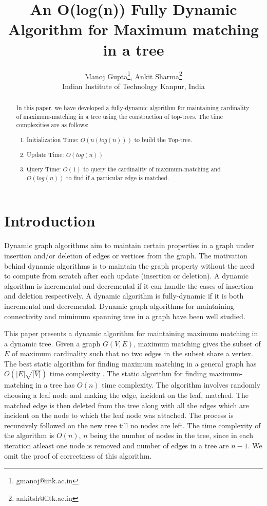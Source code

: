 \documentclass[a4paper,12pt]{article}
\title{An O(log(n)) Fully Dynamic Algorithm for Maximum matching in a tree}
\author{Manoj Gupta\footnote{gmanoj@iitk.ac.in}, Ankit Sharma\footnote{ankitsh@iitk.ac.in}\\Indian Institute of Technology Kanpur, India}
\begin{document}
\maketitle
\begin{abstract}
In this paper, we have developed a fully-dynamic algorithm for maintaining cardinality of maximum-matching in a tree using the construction of top-trees. The time complexities are as follows:
\begin{enumerate}
\item Initialization Time: $O(n(log(n)))$ to build the Top-tree.
\item Update Time: $O(log(n))$
\item Query Time: $O(1)$ to query the cardinality of maximum-matching and $O(log(n))$ to find if a particular edge is matched.
\end{enumerate}
\end{abstract}
\section{Introduction}
Dynamic graph algorithms aim to maintain certain properties in a graph under insertion and/or deletion of edges or vertices from the graph. The motivation behind dynamic algorithms is to maintain the graph property without the need to compute from scratch after each update (insertion or deletion). A dynamic algorithm is incremental and decremental if it can handle the cases of insertion and deletion respectively. A dynamic algorithm is fully-dynamic if it is both incremental and decremental. Dynamic graph algorithms for maintaining connectivity and mimimum spanning tree in a graph have been well studied.

This paper presents a dynamic algorithm for maintaining maximum matching in a dynamic tree. Given a graph $G (V,E)$, maximum matching gives the subset of $E$ of maximum cardinality such that no two edges in the subset share a vertex. The best static algorithm for finding maximum matching in a general graph has $O(|E|\sqrt{|V|})$ time complexity \cite{maxmatch-static}. The static algorithm for finding maximum-matching in a tree has $O(n)$ time complexity. The algorithm involves randomly choosing a leaf node and making the edge, incident on the leaf, matched. The matched edge is then deleted from the tree along with all the edges which are incident on the node to which the leaf node was attached. The process is recursively followed on the new tree till no nodes are left. The time complexity of the algorithm is $O(n)$, $n$ being the number of nodes in the tree, since in each iteration atleast one node is removed and number of edges in a tree are $n-1$. We omit the proof of correctness of this algorithm.
\end{document}
